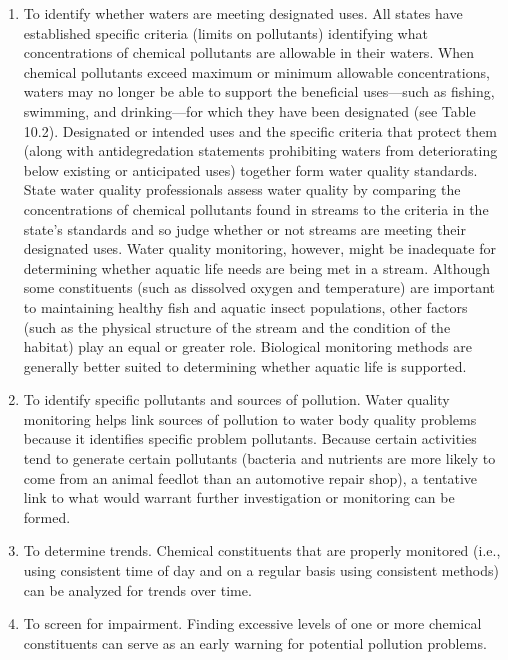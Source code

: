 \documentclass{article}
\begin{document}
\begin{enumerate}
\item
  To identify whether waters are meeting designated uses. All states
  have established specific criteria (limits on pollutants) identifying
  what concentrations of chemical pollutants are allowable in their
  waters. When chemical pollutants exceed maximum or minimum allowable
  concentrations, waters may no longer be able to support the beneficial
  uses---such as fishing, swimming, and drinking---for which they have
  been designated (see Table 10.2). Designated or intended uses and the
  specific criteria that protect them (along with antidegredation
  statements prohibiting waters from deteriorating below existing or
  anticipated uses) together form water quality standards. State water
  quality professionals assess water quality by comparing the
  concentrations of chemical pollutants found in streams to the criteria
  in the state's standards and so judge whether or not streams are
  meeting their designated uses. Water quality monitoring, however,
  might be inadequate for determining whether aquatic life needs are
  being met in a stream. Although some constituents (such as dissolved
  oxygen and temperature) are important to maintaining healthy fish and
  aquatic insect populations, other factors (such as the physical
  structure of the stream and the condition of the habitat) play an
  equal or greater role. Biological monitoring methods are generally
  better suited to determining whether aquatic life is supported.
\item
  To identify specific pollutants and sources of pollution. Water
  quality monitoring helps link sources of pollution to water body
  quality problems because it identifies specific problem pollutants.
  Because certain activities tend to generate certain pollutants
  (bacteria and nutrients are more likely to come from an animal feedlot
  than an automotive repair shop), a tentative link to what would
  warrant further investigation or monitoring can be formed.
\item
  To determine trends. Chemical constituents that are properly monitored
  (i.e., using consistent time of day and on a regular basis using
  consistent methods) can be analyzed for trends over time.
\item
  To screen for impairment. Finding excessive levels of one or more
  chemical constituents can serve as an early warning for potential
  pollution problems.
\end{enumerate}
\end{document}
